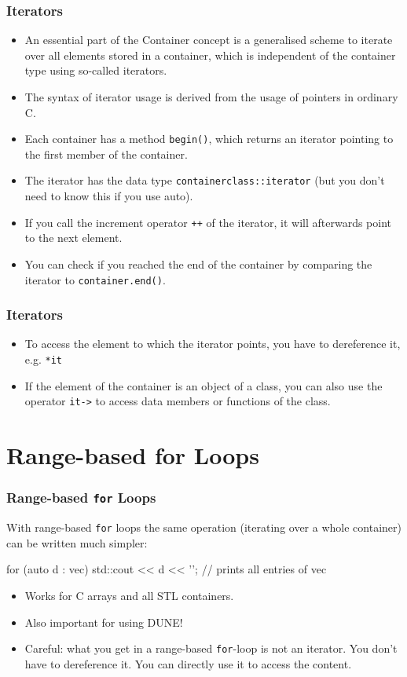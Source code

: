 \documentclass[aspectratio=169,ignorenonframetext,11pt]{beamer}
\def\inline{\lstinline[basicstyle=\small\ttfamily]}
\begin{document}
\begin{frame}
\frametitle{Iterators}
\begin{itemize}
\item An essential part of the Container concept is a generalised scheme to iterate over all elements stored in a container, which is independent of the container type using so-called iterators.
\item The syntax of iterator usage is derived from the usage of pointers in ordinary C.
\item Each container has a method \inline!begin()!, which returns an iterator pointing to the first member of the container.
\item The iterator has the data type \inline!containerclass::iterator! (but you don't need to know this if you use auto).
\item If you call the increment operator \inline!++! of the iterator, it will afterwards point to the next element.
\item You can check if you reached the end of the container by comparing the iterator to \inline!container.end()!.
\end{itemize}
\end{frame}

\begin{frame}
\frametitle<presentation>{Iterators}
\begin{itemize}
\item To access the element to which the iterator points, you have to dereference it, e.g. \inline!*it!
\item If the element of the container is an object of a class, you can also use the operator \inline!it->! to access data members or functions of the class.
\end{itemize}
\begin{codeblock}
  
\end{codeblock}
\end{frame}

\section{Range-based for Loops}

\begin{frame}[fragile]
  \frametitle<presentation>{Range-based \texttt{for} Loops}
  With range-based \inline!for! loops the same operation (iterating over a whole container) can be written much simpler:
  \begin{cppcode}
    for (auto d : vec)
      std::cout << d << '\n'; // prints all entries of vec
  \end{cppcode}
  \begin{itemize}
  \item Works for C arrays and all STL containers.
  \item Also important for using DUNE!
  \item Careful: what you get in a range-based \inline!for!-loop is not an iterator. You don't have to dereference it. You can directly use it to access the content.
  \end{itemize}
\end{frame}
\end{document}

